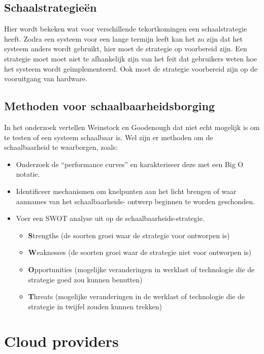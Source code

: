\subsection{Schaalstrategieën}
Hier wordt bekeken wat voor verschillende tekortkomingen een schaalstrategie heeft. Zodra een systeem voor een lange termijn leeft kan het zo zijn dat het systeem anders wordt gebruikt, hier moet de strategie op voorbereid zijn. Een strategie moet moet niet te afhankelijk zijn van het feit dat gebruikers weten hoe het systeem wordt geïmplementeerd. Ook moet de strategie voorbereid zijn op de vooruitgang van hardware.

\subsection{Methoden voor schaalbaarheidsborging}
In het onderzoek vertellen Weinstock en Goodenough dat niet echt mogelijk is om te testen of een systeem schaalbaar is. Wel zijn er methoden om de schaalbaarheid te waarborgen, zoals:
\begin{itemize}
	\item Onderzoek de \enquote{performance curves} en karakteriseer deze met een Big O notatie.
	\item Identificeer mechanismen om knelpunten aan het licht brengen of waar aannames van het schaalbaarheids- ontwerp beginnen te worden geschonden.
	\item Voer een SWOT analyse uit op de schaalbaarheids-strategie.
	\begin{itemize}
		\item \textbf{S}trengths (de soorten groei waar de strategie voor ontworpen is)
		\item \textbf{W}eaknesses (de soorten groei waar de strategie niet voor ontworpen is)
		\item \textbf{O}pportunities (mogelijke veranderingen in werklast of technologie die de strategie goed zou kunnen benutten)
		\item \textbf{T}hreats (mogelijke veranderingen in de werklast of technologie die de strategie in twijfel zouden kunnen trekken)
	\end{itemize}
\end{itemize}

\section{Cloud providers}

